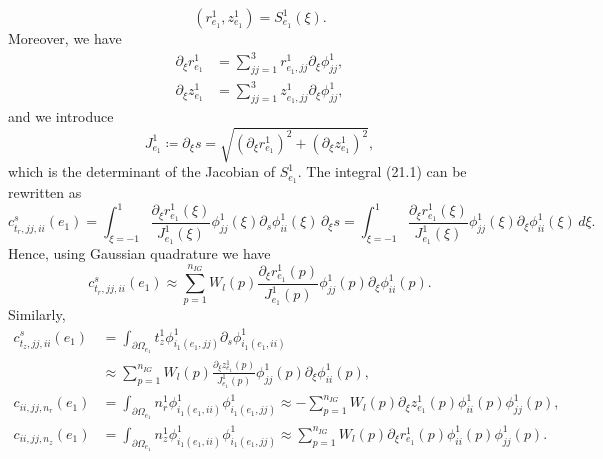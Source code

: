 \documentclass{article}
\begin{document}
\begin{equation}
(r_{e_1}^1, z_{e_1}^1) = S_{e_1}^1(\xi). \tag{21.14}
\end{equation}
Moreover, we have
\begin{align}
\partial_\xi r_{e_1}^1 &= \sum_{jj=1}^3 r_{e_1,jj}^1 \partial_\xi \phi_{jj}^1, \tag{21.15}\\
\partial_\xi z_{e_1}^1 &= \sum_{jj=1}^3 z_{e_1,jj}^1 \partial_\xi \phi_{jj}^1, \tag{21.16}
\end{align}
and we introduce
\begin{equation}
J_{e_1}^1 \coloneqq \partial_\xi s = \sqrt{ (\partial_\xi r_{e_1}^1)^2 + (\partial_\xi z_{e_1}^1)^2 }, \tag{21.19}
\end{equation}
which is the determinant of the Jacobian of \(S_{e_1}^1\). The integral (21.1) can be rewritten as
\begin{equation}
c_{t_r,jj,ii}^{s}(e_1) = \int_{\xi=-1}^{1} \frac{ \partial_\xi r_{e_1}^1(\xi) }{ J_{e_1}^1(\xi) } \phi_{jj}^1(\xi) \partial_s \phi_{ii}^1(\xi) \, \partial_\xi s = \int_{\xi=-1}^{1} \frac{ \partial_\xi r_{e_1}^1(\xi) }{ J_{e_1}^1(\xi) } \phi_{jj}^1(\xi) \partial_\xi \phi_{ii}^1(\xi) \, d\xi. \tag{21.21}
\end{equation}
Hence, using Gaussian quadrature we have
\begin{equation}
c_{t_r,jj,ii}^{s}(e_1) \approx \sum_{p=1}^{n_{IG}} W_l(p) \frac{ \partial_\xi r_{e_1}^1(p) }{ J_{e_1}^1(p) } \phi_{jj}^1(p) \partial_\xi \phi_{ii}^1(p). \tag{21.22}
\end{equation}
Similarly,
\begin{align}
c_{t_z,jj,ii}^{s}(e_1) &= \int_{\partial\Omega_{e_1}} t_z^1 \phi_{i_1(e_1,jj)}^1 \partial_s \phi_{i_1(e_1,ii)}^1 \nonumber\\
&\approx \sum_{p=1}^{n_{IG}} W_l(p) \frac{ \partial_\xi z_{e_1}^1(p) }{ J_{e_1}^1(p) } \phi_{jj}^1(p) \partial_\xi \phi_{ii}^1(p), \tag{21.25}\\
c_{ii,jj,n_r}(e_1) &= \int_{\partial\Omega_{e_1}} n_r^1 \phi_{i_1(e_1,ii)}^1 \phi_{i_1(e_1,jj)}^1 \approx -\sum_{p=1}^{n_{IG}} W_l(p) \partial_\xi z_{e_1}^1(p) \phi_{ii}^1(p) \phi_{jj}^1(p), \tag{21.29}\\
c_{ii,jj,n_z}(e_1) &= \int_{\partial\Omega_{e_1}} n_z^1 \phi_{i_1(e_1,ii)}^1 \phi_{i_1(e_1,jj)}^1 \approx \sum_{p=1}^{n_{IG}} W_l(p) \partial_\xi r_{e_1}^1(p) \phi_{ii}^1(p) \phi_{jj}^1(p). \tag{21.32}
\end{align}
\end{document}

